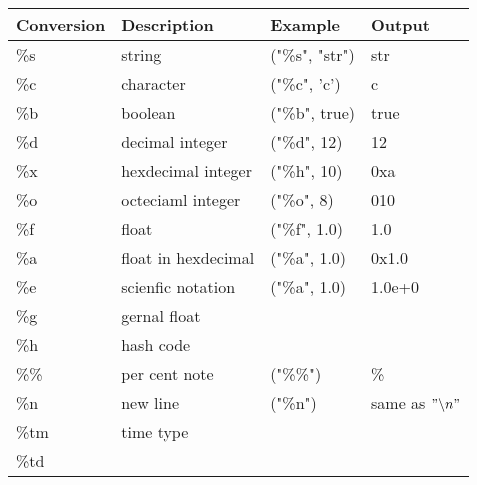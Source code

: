 \documentclass[en, 11pt, xcolor=dvipsnames]{beamer}
\begin{document}
\begin{frame}[fragile]


	\begin{columns}[c]
		\begin{column}{0.9\textwidth}

			\center\footnotesize
			\begin{table}[c]
				\begin{tabular}[c]{l l l l}
					Conversion & Description         & Example        & Output                   \\
					\hline
					\%s        & string              & ("\%s", "str") & str                      \\
					\%c        & character           & ("\%c", 'c')   & c                        \\
					\%b        & boolean             & ("\%b", true)  & true                     \\
					\%d        & decimal integer     & ("\%d", 12)    & 12                       \\
					\%x        & hexdecimal integer  & ("\%h", 10)    & 0xa                      \\
					\%o        & octeciaml integer   & ("\%o", 8)     & 010                      \\
					\%f        & float               & ("\%f", 1.0)   & 1.0                      \\
					\%a        & float in hexdecimal & ("\%a", 1.0)   & 0x1.0                    \\
					\%e        & scienfic notation   & ("\%a", 1.0)   & 1.0e+0                   \\
					\%g        & gernal float        &                &                          \\
					\%h        & hash code           &                &                          \\
					\%\%       & per cent note       & ("\%\%")       & \%                       \\
					\%n        & new line            & ("\%n")        & same as $"\backslash n"$ \\
					\%tm       & time type           &                &                          \\
					\%td       &                     &                &                          \\
					\hline
				\end{tabular}
			\end{table}

		\end{column}
	\end{columns}

\end{frame}
\end{document}

